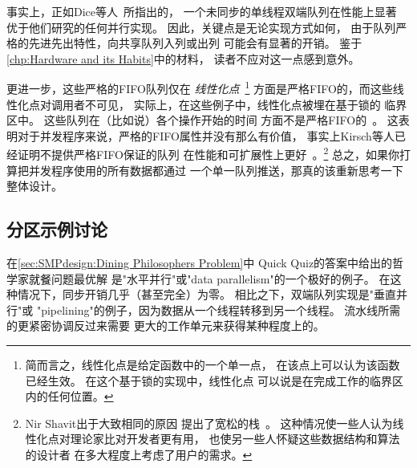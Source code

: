 \QuickQuizEnd

事实上，正如Dice等人~\cite{DavidDice:2010:SCA:HTM:deque}所指出的，
一个未同步的单线程双端队列在性能上显著
优于他们研究的任何并行实现。
因此，关键点是无论实现方式如何，
由于队列严格的先进先出特性，向共享队列入列或出列
可能会有显著的开销。
鉴于\cref{chp:Hardware and its Habits}中的材料，
读者不应对这一点感到意外。

更进一步，这些严格的FIFO队列仅在
\emph{线性化点}~\cite{Herlihy:1990:LCC:78969.78972}\footnote{
	简而言之，线性化点是给定函数中的一个单一点，
	在该点上可以认为该函数已经生效。
	在这个基于锁的实现中，线性化点
	可以说是在完成工作的临界区内的任何位置。}
方面是严格FIFO的，而这些线性化点对调用者不可见，
实际上，在这些例子中，线性化点被埋在基于锁的
临界区中。
这些队列在（比如说）各个操作开始的时间
方面不是严格FIFO的~\cite{AndreasHaas2012FIFOisnt}。
这表明对于并发程序来说，严格的FIFO属性并没有那么有价值，
事实上Kirsch等人已经证明不提供严格FIFO保证的队列
在性能和可扩展性上更好~\cite{ChristophMKirsch2012FIFOisntTR}。\footnote{
	Nir Shavit出于大致相同的原因
	提出了宽松的栈~\cite{Shavit:2011:DSM:1897852.1897873}。
	这种情况使一些人认为线性化点对理论家比对开发者更有用，
	也使另一些人怀疑这些数据结构和算法的设计者
	在多大程度上考虑了用户的需求。}
总之，如果你打算把并发程序使用的所有数据都通过
一个单一队列推送，那真的该重新思考一下整体设计。

\subsection{分区示例讨论}
\label{sec:SMPdesign:Partitioning Example Discussion}

在\cref{sec:SMPdesign:Dining Philosophers Problem}中
Quick Quiz的答案中给出的哲学家就餐问题最优解
是"水平并行"或"data parallelism"的一个极好的例子。
在这种情况下，同步开销几乎（甚至完全）为零。
相比之下，双端队列实现是"垂直并行"或
"pipelining"的例子，因为数据从一个线程转移到另一个线程。
流水线所需的更紧密协调反过来需要
更大的工作单元来获得某种程度上的。

